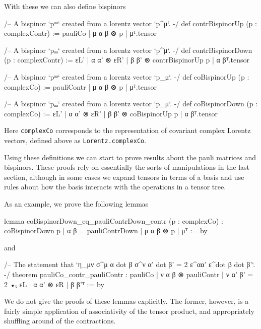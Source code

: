 \documentclass[a4paper, 11pt]{article}
\DeclareRobustCommand{\myinline}{\lstinline}
\begin{document}
With these we can also define bispinors 
\begin{code}
/-- A bispinor `pᵃᵃ` created from a lorentz vector `p^μ`. -/
def contrBispinorUp (p : complexContr) :=
  {pauliCo | μ α β ⊗ p | μ}ᵀ.tensor

/-- A bispinor `pₐₐ` created from a lorentz vector `p^μ`. -/
def contrBispinorDown (p : complexContr) :=
  {εL' | α α' ⊗ εR' | β β' ⊗ contrBispinorUp p | α β}ᵀ.tensor

/-- A bispinor `pᵃᵃ` created from a lorentz vector `p_μ`. -/
def coBispinorUp (p : complexCo) := {pauliContr | μ α β ⊗ p | μ}ᵀ.tensor

/-- A bispinor `pₐₐ` created from a lorentz vector `p_μ`. -/
def coBispinorDown (p : complexCo) :=
  {εL' | α α' ⊗ εR' | β β' ⊗ coBispinorUp p | α β}ᵀ.tensor
\end{code}
Here  \myinline|complexCo| corresponds to the representation of covariant complex Lorentz vectors, 
defined above as \myinline|Lorentz.complexCo|.

Using these definitions we can start to prove results about the pauli matrices and bispinors. 
These proofs rely on essentially the sorts of manipulations in the last section, although in some cases 
we expand tensors in terms of a basis and use rules about how the basis interacts with the operations in a tensor tree. 

As an example, we prove the following lemmas
\begin{code}
lemma coBispinorDown_eq_pauliContrDown_contr (p : complexCo) :
  {coBispinorDown p | α β = pauliContrDown | μ α β ⊗ p | μ}ᵀ := by
\end{code}
and 
\begin{code}
/-- The statement that `η_{μν} σ^{μ α dot β} σ^{ν α' dot β'} = 2 ε^{αα'} ε^{dot β dot β'}`. -/
theorem pauliCo_contr_pauliContr :
    {pauliCo | ν α β ⊗ pauliContr | ν α' β' = 2 •ₜ εL | α α' ⊗ εR | β β'}ᵀ := by
\end{code}
We do not give the proofs of these lemmas explicitly. 
The former, however, is a fairly simple application of  associativity of the tensor product, and appropriately shuffling 
around of the contractions. 
\end{document}
